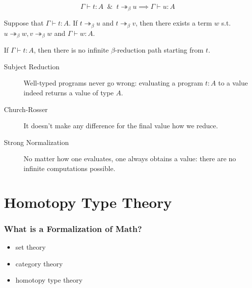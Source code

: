 \documentclass[UTF8,11pt,colorlinks,compress,openany]{beamer}%
\begin{document}
\begin{frame}\frametitle{}
\setlength\abovedisplayskip{0pt}
\setlength\belowdisplayskip{0pt}
\begin{lemma}
\centerline{}
\end{lemma}\vspace*{-1ex}
\begin{theorem}
\[\Gamma\vdash t: A\;\;\&\;\;t\twoheadrightarrow_\beta u\implies\Gamma\vdash u: A\]
\end{theorem}\vspace*{-1ex}
\begin{theorem}
Suppose that $\Gamma\vdash t: A$. If $t\twoheadrightarrow_\beta u$ and $t\twoheadrightarrow_\beta v$, then there exists a term $w$ s.t. $u\twoheadrightarrow_\beta w, v\twoheadrightarrow_\beta w$ and $\Gamma\vdash w: A$.
\end{theorem}\vspace*{-1ex}
\begin{theorem}
If $\Gamma\vdash t: A$, then there is no infinite $\beta$-reduction path starting
from $t$.
\end{theorem}
{\small 
\begin{description}
\item[Subject Reduction]
Well-typed programs never go wrong: evaluating a program $t: A$ to a value indeed returns a value of type $A$.
\item[Church-Rosser] It doesn't make any difference for the final value how we reduce.
\item[Strong Normalization] No matter how one evaluates, one always obtains a value: there are no infinite computations possible.
\end{description}
}
\end{frame}


\section{Homotopy Type Theory}


\begin{frame}\frametitle{What is a Formalization of Math?}
\begin{itemize}
	\item set theory
	\item category theory
	\item homotopy type theory
\end{itemize}
\end{frame}
\end{document}
